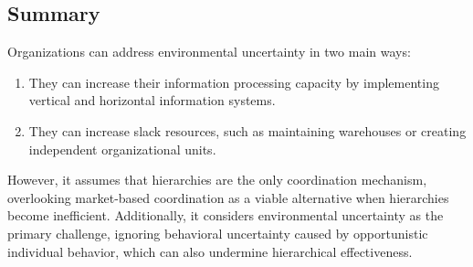 \subsection{Summary}
Organizations can address environmental uncertainty in two main ways: 
\begin{enumerate}
    \item They can increase their information processing capacity by implementing vertical and horizontal information systems.
    \item They can increase slack resources, such as maintaining warehouses or creating independent organizational units.
\end{enumerate}
\noindent However, it assumes that hierarchies are the only coordination mechanism, overlooking market-based coordination as a viable alternative when hierarchies become inefficient. 
Additionally, it considers environmental uncertainty as the primary challenge, ignoring behavioral uncertainty caused by opportunistic individual behavior, which can also undermine hierarchical effectiveness. 